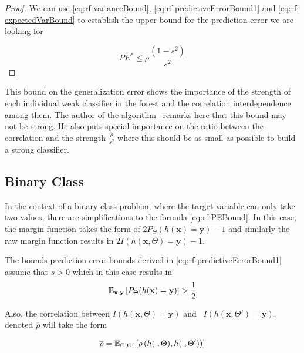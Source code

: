 \begin{proof}
	We can use \cref{eq:rf-varianceBound}, \cref{eq:rf-predictiveErrorBound1} and \cref{eq:rf-expectedVarBound} to establish the upper bound for the prediction error we are looking for

            \begin{equation}\label{eq:rf-PEBound}
            PE^* \leq \overline{\rho}\frac{(1-s^2)}{s^2}
            \end{equation}

\end{proof}


This bound on the generalization error shows the importance of the strength of each individual weak classifier in the forest and the correlation interdependence among them. The author of the algorithm~\cite{breiman-randomforests} remarks here that this bound may not be strong. He also puts special importance on the ratio between the correlation and the strength $\frac{\overline{\rho}}{s^2}$ where this should be as small as possible to build a strong classifier.


\subsection{Binary Class}\label{subsection:random_forests_binary_class}

In the context of a binary class problem, where the target variable can only take two values, there are simplifications to the formula \cref{eq:rf-PEBound}. In this case, the margin function takes the form of $2 P_{\Theta}(h(\textbf{x}) = \textbf{y}) -1$ and similarly the raw margin function results in $2 I(h(\textbf{x}, \Theta) = \textbf{y}) -1$.


The bounds prediction error bounds derived in \cref{eq:rf-predictiveErrorBound1} assume that $s >0$ which in this case results in
\begin{equation}
\operatorname{\mathbb{E}}_{\textbf{x},\textbf{y}} \left[ P_{\Theta}(h(\textbf{x}) = \textbf{y}) \right] > \frac{1}{2}
\end{equation}


Also, the correlation between $I(h(\textbf{x}, \Theta) = \textbf{y})$ and \ $I(h(\textbf{x}, \Theta') = \textbf{y})$, denoted $\overline{\rho}$ will take the form

\begin{equation}
 \overline{\rho} = \operatorname{\mathbb{E}}_{\Theta,\Theta'} \left[ \rho \left( h(\cdot{},\Theta) ,h(\cdot{},\Theta') \right)  \right]
 \end{equation}




